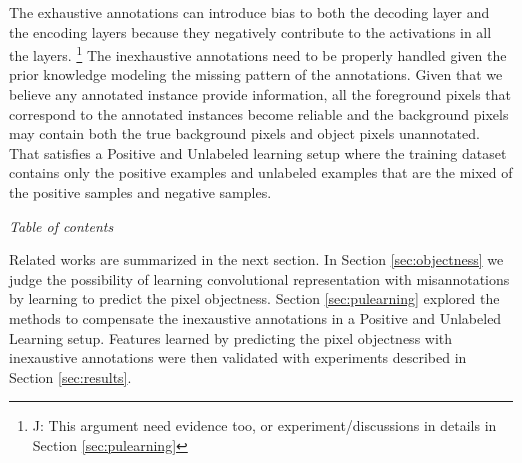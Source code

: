 \noindent
The exhaustive annotations can introduce bias to both the decoding layer and the encoding layers because they negatively contribute to the activations in all the layers.
\footnote{J: This argument need evidence too, or experiment/discussions in details in Section \ref{sec:pulearning}}
The inexhaustive annotations need to be properly handled given the prior knowledge modeling the missing pattern of the annotations.
Given that we believe any annotated instance provide information, all the foreground pixels that correspond to the annotated instances become reliable and the background pixels may contain both the true background pixels and object pixels unannotated.
That satisfies a Positive and Unlabeled learning setup where the training dataset contains only the positive examples and unlabeled examples that are the mixed of the positive samples and negative samples.



\noindent
\textit{Table of contents}

\noindent
Related works are summarized in the next section.
In Section \ref{sec:objectness} we judge the possibility of learning convolutional representation with misannotations by learning to predict the pixel objectness.
Section \ref{sec:pulearning} explored the methods to compensate the inexaustive annotations in a Positive and Unlabeled Learning setup.
Features learned by predicting the pixel objectness with inexaustive annotations were then validated with experiments described in Section \ref{sec:results}.

%
